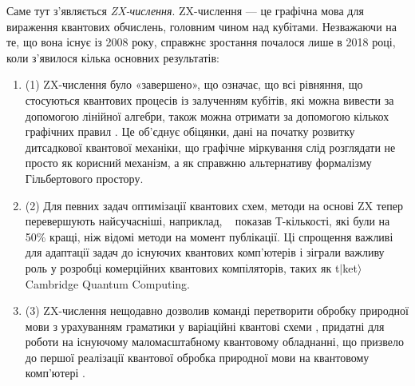 \documentclass[11pt]{article}
\theoremstyle{definition}
\def\bR{\begin{color}{red}}
\def\bB{\begin{color}{blue}}
\def\e{\end{color}\xspace}
\newcommand{\ben}{\begin{enumerate}}
\newcommand{\een}{\end{enumerate}\par\noindent}
\newcommand{\TODOb}[1]{\marginpar{\scriptsize\bR \textbf{TODO:} #1\e}}
\begin{document}
Саме тут з'являється \textit{ZX-числення}.
ZX-числення — це графічна мова для вираження квантових обчислень, головним чином над кубітами. Незважаючи на те, що вона існує із 2008 року, справжнє зростання почалося лише в 2018 році, коли з’явилося кілька основних результатів:
 \ben
 \item[(1)] ZX-числення було «завершено», що означає, що всі рівняння, що стосуються квантових процесів із залученням кубітів, які можна вивести за допомогою лінійної алгебри, також можна отримати за допомогою кількох графічних правил \cite{hadzihasanovic2018two, vilmart2019near}. Це об’єднує обіцянки, дані на початку розвитку дитсадкової квантової механіки, що графічне міркування слід розглядати не просто як корисний механізм, а як справжню альтернативу формалізму Гільбертового простору.
 \item[(2)] Для певних задач оптимізації квантових схем,
 методи на основі ZX тепер перевершують найсучасніші, наприклад, ~\cite{de2020fast} показав Т-кількості, які були на 50\% кращі, ніж відомі методи на момент публікації. Ці спрощення важливі для адаптації задач до існуючих квантових комп’ютерів і зіграли важливу роль у розробці комерційних квантових компіляторів, таких як t$|$ket$\rangle$ \cite{sivarajah2020t} Cambridge Quantum Computing.
 \item[(3)] ZX-числення нещодавно дозволив команді перетворити обробку природної мови з урахуванням граматики \cite{CSC} у варіаційні квантові схеми \cite{QNLP-foundations}, придатні для роботи на існуючому маломасштабному квантовому обладнанні, що призвело до першої реалізації квантової обробка природної мови на квантовому комп’ютері \cite{Nature}. %
 \een      
     
\end{document}
